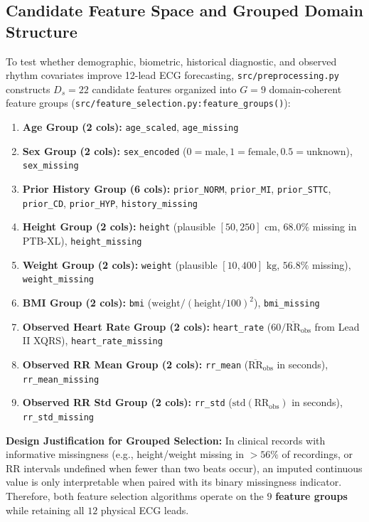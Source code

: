 \documentclass[11pt,a4paper]{article}
\begin{document}
\subsection{Candidate Feature Space and Grouped Domain Structure}
To test whether demographic, biometric, historical diagnostic, and observed rhythm covariates improve 12-lead ECG forecasting, \texttt{src/preprocessing.py} constructs $D_s = 22$ candidate features organized into $G = 9$ domain-coherent feature groups (\texttt{src/feature\_selection.py:feature\_groups()}):
\begin{enumerate}
    \item \textbf{Age Group (2 cols):} \texttt{age\_scaled}, \texttt{age\_missing}
    \item \textbf{Sex Group (2 cols):} \texttt{sex\_encoded} ($0=\text{male}, 1=\text{female}, 0.5=\text{unknown}$), \texttt{sex\_missing}
    \item \textbf{Prior History Group (6 cols):} \texttt{prior\_NORM}, \texttt{prior\_MI}, \texttt{prior\_STTC}, \texttt{prior\_CD}, \texttt{prior\_HYP}, \texttt{history\_missing}
    \item \textbf{Height Group (2 cols):} \texttt{height} (plausible $[50, 250]\text{ cm}$, $68.0\%$ missing in PTB-XL), \texttt{height\_missing}
    \item \textbf{Weight Group (2 cols):} \texttt{weight} (plausible $[10, 400]\text{ kg}$, $56.8\%$ missing), \texttt{weight\_missing}
    \item \textbf{BMI Group (2 cols):} \texttt{bmi} ($\text{weight} / (\text{height}/100)^2$), \texttt{bmi\_missing}
    \item \textbf{Observed Heart Rate Group (2 cols):} \texttt{heart\_rate} ($60 / \overline{\text{RR}}_{\text{obs}}$ from Lead II XQRS), \texttt{heart\_rate\_missing}
    \item \textbf{Observed RR Mean Group (2 cols):} \texttt{rr\_mean} ($\overline{\text{RR}}_{\text{obs}}$ in seconds), \texttt{rr\_mean\_missing}
    \item \textbf{Observed RR Std Group (2 cols):} \texttt{rr\_std} ($\text{std}(\text{RR}_{\text{obs}})$ in seconds), \texttt{rr\_std\_missing}
\end{enumerate}

\textbf{Design Justification for Grouped Selection:} In clinical records with informative missingness (e.g., height/weight missing in $>56\%$ of recordings, or RR intervals undefined when fewer than two beats occur), an imputed continuous value is only interpretable when paired with its binary missingness indicator. Therefore, both feature selection algorithms operate on the $9$ \textbf{feature groups} while retaining all $12$ physical ECG leads.
\end{document}
